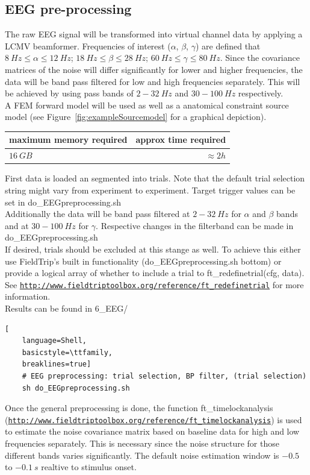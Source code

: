 \documentclass[12pt,a4paper]{scrartcl}
\begin{document}
\subsection{EEG pre-processing}
The raw EEG signal will be transformed into virtual channel data by applying a LCMV beamformer. Frequencies of interest ($\alpha$, $\beta$, $\gamma$) are defined that $8~Hz \leq \alpha \leq 12~Hz$; $18~Hz \leq \beta \leq 28~Hz$; $60~Hz \leq \gamma \leq 80~Hz$. Since the covariance matrices of the noise will differ significantly for lower and higher frequencies, the data will be band pass filtered for low and high frequencies separately. This will be achieved by using pass bands of $2-32~Hz$ and $30-100~Hz$ respectively.\\
A FEM forward model will be used as well as a anatomical constraint source model (see Figure~\ref{fig:exampleSourcemodel} for a graphical depiction).\\
\begin{table}[h]
\begin{tabular}{l | r}
\toprule
maximum memory required & approx time required\\\toprule
$16~GB$ & $\approx 2h$ \\\bottomrule
\end{tabular}
\end{table}
First data is loaded an segmented into trials. Note that the default trial selection string might vary from experiment to experiment. Target trigger values can be set in do\_EEGpreprocessing.sh\\
Additionally the data will be band pass filtered at $2-32~Hz$ for $\alpha$ and $\beta$ bands and at $30-100~Hz$ for $\gamma$. Respective changes in the filterband can be made in do\_EEGpreprocessing.sh\\
If desired, trials should be excluded at this stange as well. To achieve this either use FieldTrip's built in functionality (do\_EEGpreprocessing.sh bottom) or provide a logical array of whether to include a trial to ft\_redefinetrial(cfg, data). See \href{http://www.fieldtriptoolbox.org/reference/ft_redefinetrial}{\nolinkurl{http://www.fieldtriptoolbox.org/reference/ft\_redefinetrial}} for more information.\\

\noindent Results can be found in 6\_EEG/\\
\begin{lstlisting}[
    language=Shell,
    basicstyle=\ttfamily,
    breaklines=true]
    # EEG preprocessing: trial selection, BP filter, (trial selection)
    sh do_EEGpreprocessing.sh
\end{lstlisting}
Once the general preprocessing is done, the function ft\_timelockanalysis (\href{http://www.fieldtriptoolbox.org/reference/ft\_timelockanalysis}{\nolinkurl{http://www.fieldtriptoolbox.org/reference/ft\_timelockanalysis}}) is used to estimate the noise covariance matrix based on baseline data for high and low frequencies separately. This is necessary since the noise structure for those different bands varies significantly. The default noise estimation window is $-0.5$ to $-0.1~s$ realtive to stimulus onset.\\
\end{document}
